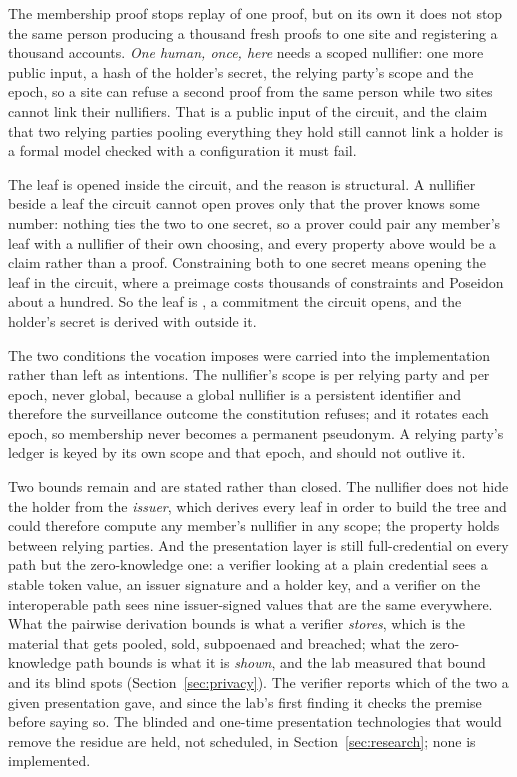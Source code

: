 The membership proof stops replay of one proof, but on its own it does not stop the same person
producing a thousand fresh proofs to one site and registering a thousand accounts. \emph{One human,
once, here} needs a scoped nullifier: one more public input, a hash of the holder's secret, the
relying party's scope and the epoch, so a site can refuse a second proof from the same person while
two sites cannot link their nullifiers. That is a public input of the circuit, and the claim that two
relying parties pooling everything they hold still cannot link a holder is a formal model checked
with a configuration it must fail. \sImpl

The leaf is opened inside the circuit, and the reason is structural. A nullifier beside a leaf the
circuit cannot open proves only that the prover knows some number: nothing ties the two to one
secret, so a prover could pair any member's leaf with a nullifier of their own choosing, and every
property above would be a claim rather than a proof. Constraining both to one secret means opening
the leaf in the circuit, where a  preimage costs thousands of constraints and
Poseidon about a hundred. So the leaf is , a commitment the
circuit opens, and the holder's secret is derived with  outside it.

The two conditions the vocation imposes were carried into the implementation rather than left as
intentions. The nullifier's scope is per relying party and per epoch, never global, because a global
nullifier is a persistent identifier and therefore the surveillance outcome the constitution refuses;
and it rotates each epoch, so membership never becomes a permanent pseudonym. A relying party's
ledger is keyed by its own scope and that epoch, and should not outlive it.

Two bounds remain and are stated rather than closed. The nullifier does not hide the holder from the
\emph{issuer}, which derives every leaf in order to build the tree and could therefore compute any
member's nullifier in any scope; the property holds between relying parties. And the presentation
layer is still full-credential on every path but the zero-knowledge one: a verifier looking at a
plain credential sees a stable token value, an issuer signature and a holder key, and a verifier on
the interoperable path sees nine issuer-signed values that are the same everywhere. What the
pairwise derivation bounds is what a verifier \emph{stores}, which is the material that gets pooled,
sold, subpoenaed and breached; what the zero-knowledge path bounds is what it is \emph{shown}, and
the lab measured that bound and its blind spots (Section~\ref{sec:privacy}). The verifier reports
which of the two a given presentation gave, and since the lab's first finding it checks the premise
before saying so. The blinded and one-time presentation technologies that would remove the residue
are held, not scheduled, in Section~\ref{sec:research}; none is implemented. \sFut

